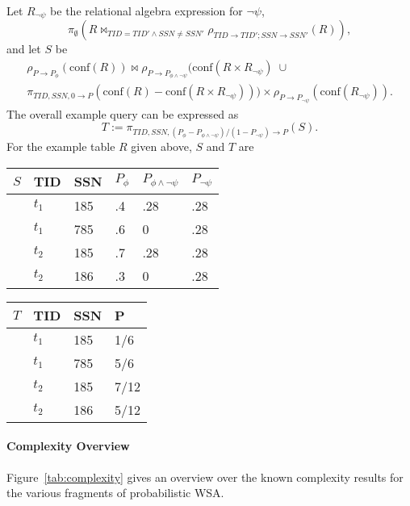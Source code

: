 \begin{example}
Let $R_{\neg \psi}$ be the relational algebra expression for $\neg \psi$,
\[
\pi_\emptyset(R
   \bowtie_{TID=TID' \land SSN \neq SSN'}
   \rho_{TID \rightarrow TID'; SSN \rightarrow SSN'}(R)),
\]
and let $S$ be
\begin{multline*}
\rho_{P \rightarrow P_\phi}(\mbox{conf}(R)) \bowtie
\rho_{P \rightarrow P_{\phi \land \neg \psi}}
\big(
\mbox{conf}(R \times R_{\neg \psi})
\; \cup \\
\pi_{TID, SSN, 0 \rightarrow P}
(\mbox{conf}(R) - \mbox{conf}(R \times R_{\neg \psi}))
\big)
\times
\rho_{P \rightarrow P_{\neg \psi}}(\mbox{conf}(R_{\neg \psi})).
\end{multline*}
The overall example query can be expressed as
\[
T :=
\pi_{TID, SSN, (P_\phi - P_{\phi \land \neg \psi})/(1 - P_{\neg \psi}) \rightarrow P}(S).
\]
For the example table $R$ given above, $S$ and $T$ are
\begin{center}
\begin{tabular}{l|lllll}
\hline
$S$ & TID & SSN & $P_\phi$ & $P_{\phi \land \neg \psi}$ & $P_{\neg \psi}$ \\
\hline
& $t_1$ & 185 & .4 & .28 & .28 \\
& $t_1$ & 785 & .6 & 0   & .28 \\
& $t_2$ & 185 & .7 & .28 & .28 \\
& $t_2$ & 186 & .3 & 0   & .28 \\
\end{tabular}
\hspace{5mm}
\begin{tabular}{l|lll}
\hline
$T$ & TID & SSN & P \\
\hline
& $t_1$ & 185 & 1/6 \\
& $t_1$ & 785 & 5/6 \\
& $t_2$ & 185 & 7/12 \\
& $t_2$ & 186 & 5/12 \\
\end{tabular}
\end{center}
\end{example}



\paragraph{Complexity Overview}
%
Figure~\ref{tab:complexity} gives an overview over the known complexity results for the various fragments of probabilistic WSA.


